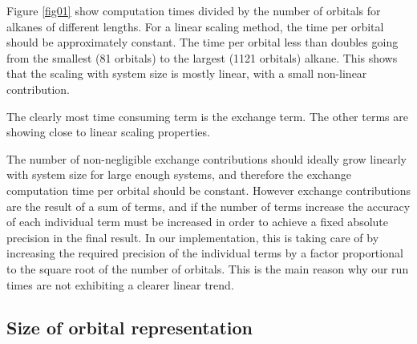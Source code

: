 \documentclass{article}
\begin{document}
Figure \ref{fig01} show computation times divided by the number of orbitals for alkanes of different lengths. For a linear scaling method, the time per orbital should be approximately constant.  The time per orbital less than doubles going from the smallest (81 orbitals) to the largest (1121 orbitals) alkane. This shows that the scaling with system size is mostly linear, with a small non-linear contribution.  




The clearly most time consuming term is the exchange term. The other terms are showing close to linear scaling properties.

The number of non-negligible exchange contributions should ideally grow linearly with system size for large enough systems, and therefore the exchange computation time per orbital should be constant. However exchange contributions are the result of a sum of terms, and if the number of terms increase the accuracy of each individual term must be increased in order to achieve a fixed absolute precision in the final result. In our implementation, this is taking care of by increasing the required precision of the individual terms by a factor proportional to the square root of the number of orbitals. This is the main reason why our run times are not exhibiting a clearer linear trend.


\subsection{Size of orbital representation}
\label{sizes}
\end{document}
